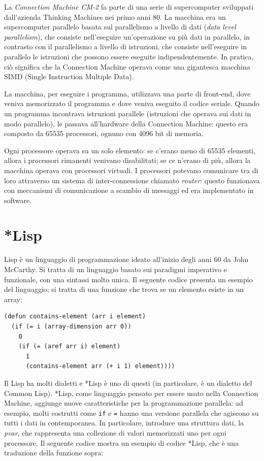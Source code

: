 \documentclass[12pt,a4paper,openright,twoside]{report}
\begin{document}
La \textit{Connection Machine CM-2} fa parte di una serie di supercomputer sviluppati dall'azienda Thinking Machines nei primo anni 80. La macchina era un supercomputer parallelo basata sul parallelismo a livello di dati (\textit{data level parallelism}), che consiste nell'eseguire un'operazione su più dati in parallelo, in contrasto con il parallelismo a livello di istruzioni, che consiste nell'eseguire in parallelo le istruzioni che possono essere eseguite indipendentemente. In pratica, ciò significa che la Connection Machine operava come una gigantesca macchina SIMD (Single Instruction Multiple Data).

La macchina, per eseguire i programma, utilizzava una parte di front-end, dove veniva memorizzato il programma e dove veniva eseguito il codice seriale. Quando un programma incontrava istruzioni parallele (istruzioni che operava sui dati in modo parallelo), le passava all'hardware della Connection Machine: questo era composto da 65535 processori, ognuno con 4096 bit di memoria.

Ogni processore operava su un solo elemento: se c'erano meno di 65535 elementi, allora i processori rimanenti venivano disabilitati; se ce n'erano di più, allora la macchina operava con processori virtuali. I processori potevano comunicare tra di loro attraverso un sistema di inter-connessione chiamato \textit{router}: questo funzionava con meccanismi di comunicazione a scambio di messaggi ed era implementato in software.

\section{*Lisp}

Lisp è un linguaggio di programmazione ideato all'inizio degli anni 60 da John McCarthy. Si tratta di un linguaggio basato sui paradigmi imperativo e funzionale, con una sintassi molto unica. Il seguente codice presenta un esempio del linguaggio; si tratta di una funzione che trova se un elemento esiste in un array:

\begin{lstlisting}[caption=Esempio di codice Lisp. Questa funzione implementa la ricerca nell'array in maniera ricorsiva in concordanza con il paradigma funzionale.]
(defun contains-element (arr i element)
  (if (= i (array-dimension arr 0))
    0
    (if (= (aref arr i) element)
      1
      (contains-element arr (+ i 1) element))))
\end{lstlisting}

Il Lisp ha molti dialetti e *Lisp è uno di questi (in particolare, è un dialetto del Common Lisp). *Lisp, come linguaggio pensato per essere usato nella Connection Machine, aggiunge nuove caratteristiche per la programmazione parallela: ad esempio, molti costrutti come \verb|if| e \verb|=| hanno una versione parallela che agiscono su tutti i dati in contemporanea. In particolare, introduce una struttura dati, la \textit{pvar}, che rappresenta una collezione di valori memorizzati uno per ogni processore. Il seguente codice mostra un esempio di codice *Lisp, che è una traduzione della funzione sopra:
\end{document}
